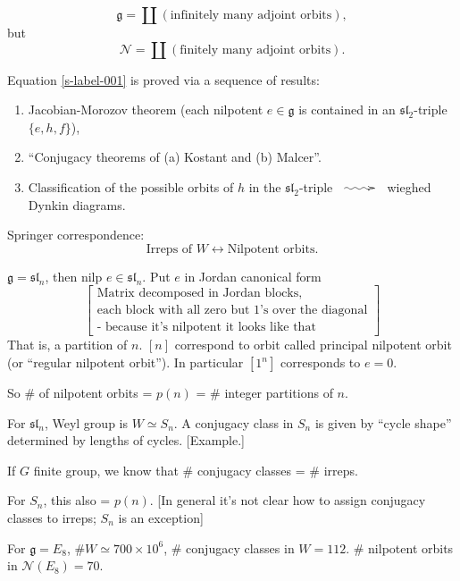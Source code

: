 $$
\mathfrak{g}=\coprod (\text{infinitely many
adjoint orbits}),
$$
but
\begin{equation}
\label{s-label-001}
\mathcal{N}=\coprod(\text{finitely many
adjoint orbits}).
\end{equation}

\noindent
Equation
\ref{s-label-001}
is proved via a sequence of results:
\begin{enumerate}
\item Jacobian-Morozov theorem
(each nilpotent $e \in \mathfrak{g}$ is
contained in an $\mathfrak{sl}_2$-triple
$\{e,h,f\}$),

\item ``Conjugacy theorems of (a) Kostant
and (b) Malcer''.

\item Classification of the possible
orbits of $h$ in the $\mathfrak{sl}_2$-triple
$\xymatrix{\ar@{~>}[r]&}$ wieghed Dynkin
diagrams.
\end{enumerate}

\medskip\noindent
Springer correspondence:
$$
\text{Irreps of $W$}
\leftrightarrow
\text{Nilpotent orbits}.
$$
\begin{example}
\label{example-sln-nilpotent}
$\mathfrak{g}=\mathfrak{sl}_n$, then nilp $e
\in \mathfrak{sl}_n$. Put $e$ in Jordan
canonical form
$$
\left[\substack{\text{Matrix decomposed in
Jordan blocks,}\\
\text{each block with all zero but 1's over
the diagonal}\\
\text{- because it's nilpotent it looks like
that}}\right]
$$
That is, a partition of $n$. $[n]$ correspond
to orbit called principal nilpotent orbit (or
``regular nilpotent orbit''). In particular
$[1^n]$ corresponds to $e=0$.

So \# of nilpotent orbits = $p(n) $ =
\# integer partitions of $n$.

For $\mathfrak{sl}_n$, Weyl group is $W
\simeq S_n$. A conjugacy class in $S_n$ is
given by ``cycle shape'' determined by
lengths of cycles. [Example.]

If $G$ finite group, we know that
\# conjugacy classes = \# irreps.

For $S_n$, this also = $p(n)$. [In general
it's not clear how to assign conjugacy
classes to irreps; $S_n$ is an exception]
\end{example}

\noindent
For $\mathfrak{g}=E_8$, $\# W \simeq 700
\times 10^6$,
\# conjugacy classes in  $W=112$.
\# nilpotent orbits in $\mathcal{N}(E_8)=70$.

